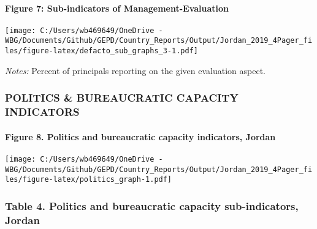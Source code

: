 \documentclass[twocolumn]{article}
\let\oldparagraph\paragraph
\renewcommand{\paragraph}[1]{\oldparagraph{#1}\mbox{}}
\begin{document}
\hypertarget{figure-7-sub-indicators-of-management-evaluation}{%
\paragraph{Figure 7: Sub-indicators of
Management-Evaluation}\label{figure-7-sub-indicators-of-management-evaluation}}

\texttt{[image: C:/Users/wb469649/OneDrive - WBG/Documents/Github/GEPD/Country\_Reports/Output/Jordan\_2019\_4Pager\_files/figure-latex/defacto\_sub\_graphs\_3-1.pdf]}

\color{darkgray}\scriptsize{\textit{Notes:} Percent of principals reporting on the given evaluation aspect.}

\vfill\null

\hypertarget{politics-bureaucratic-capacity-indicators}{%
\subsubsection{\texorpdfstring{\textbf{POLITICS \& BUREAUCRATIC CAPACITY
INDICATORS}}{POLITICS \& BUREAUCRATIC CAPACITY INDICATORS}}\label{politics-bureaucratic-capacity-indicators}}


\hypertarget{figure-8.-politics-and-bureaucratic-capacity-indicators-jordan}{%
\paragraph{Figure 8. Politics and bureaucratic capacity indicators,
Jordan}\label{figure-8.-politics-and-bureaucratic-capacity-indicators-jordan}}

\texttt{[image: C:/Users/wb469649/OneDrive - WBG/Documents/Github/GEPD/Country\_Reports/Output/Jordan\_2019\_4Pager\_files/figure-latex/politics\_graph-1.pdf]}

\hypertarget{table-4.-politics-and-bureaucratic-capacity-sub-indicators-jordan}{%
\subsubsection{Table 4. Politics and bureaucratic capacity
sub-indicators,
Jordan}\label{table-4.-politics-and-bureaucratic-capacity-sub-indicators-jordan}}
\end{document}
